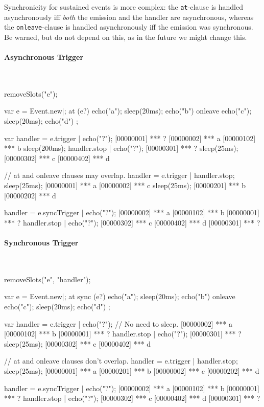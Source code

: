 Synchronicity for sustained events is more complex: the
\lstinline|at|-clause is handled asynchronously iff \emph{both} the emission
and the handler are asynchronous, whereas the \lstinline|onleave|-clause is
handled asynchronously iff the emission was synchronous.  Be warned, but do
not depend on this, as in the future we might change this.

\begin{multicols}{2}
\paragraph{Asynchronous Trigger}~

\begin{urbicomment}
removeSlots("e");
\end{urbicomment}
\begin{urbiscript}[xrightmargin=0mm,xleftmargin=0mm]
var e = Event.new|;
at (e?)
  { echo("a"); sleep(20ms); echo("b") }
onleave
  { echo("c"); sleep(20ms); echo("d") };

var handler = e.trigger | echo("?");
[00000001] *** ?
[00000002] *** a
[00000102] *** b
sleep(200ms);
handler.stop | echo("?");
[00000301] *** ?
sleep(25ms);
[00000302] *** c
[00000402] *** d

// at and onleave clauses may overlap.
handler = e.trigger | handler.stop;
sleep(25ms);
[00000001] *** a
[00000002] *** c
sleep(25ms);
[00000201] *** b
[00000202] *** d

handler = e.syncTrigger | echo("?");
[00000002] *** a
[00000102] *** b
[00000001] *** ?
handler.stop | echo("?");
[00000302] *** c
[00000402] *** d
[00000301] *** ?
\end{urbiscript}
\columnbreak

\paragraph{Synchronous Trigger}~

\begin{urbicomment}
removeSlots("e", "handler");
\end{urbicomment}
\begin{urbiscript}[xrightmargin=0mm,xleftmargin=0mm]
var e = Event.new|;
at sync (e?)
  { echo("a"); sleep(20ms); echo("b") }
onleave
  { echo("c"); sleep(20ms); echo("d") };

var handler = e.trigger | echo("?");
// No need to sleep.
[00000002] *** a
[00000102] *** b
[00000001] *** ?
handler.stop | echo("?");
[00000301] *** ?
sleep(25ms);
[00000302] *** c
[00000402] *** d

// at and onleave clauses don't overlap.
handler = e.trigger | handler.stop;
sleep(25ms);
[00000001] *** a
[00000201] *** b
[00000002] *** c
[00000202] *** d

handler = e.syncTrigger | echo("?");
[00000002] *** a
[00000102] *** b
[00000001] *** ?
handler.stop | echo("?");
[00000302] *** c
[00000402] *** d
[00000301] *** ?
\end{urbiscript}
\end{multicols}


